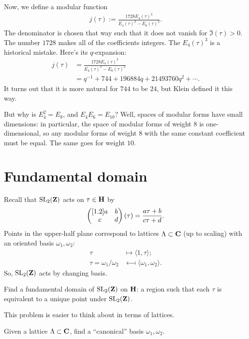 \documentclass[11pt, oneside,margin=1in]{article}
\begin{document}
\begin{example}[ ]
Now, we define a modular function
 \begin{align*}
	j(\tau) :=  \frac{1728E_4(\tau)^3}{E_4(\tau)^3 -  E_6(\tau)^2}.
\end{align*}
The denominator is chosen that way such that it does not vanish for $\Im(\tau)>0$. The number $1728$ makes all of the coefficients integers. The $E_4(\tau)^3$ is a historical mistake. Here's its  $q$-expansion:
\begin{align*}
	j(\tau) &=  \frac{1728E_4(\tau)^3}{E_4(\tau)^3 -  E_6(\tau)^2}\\
		&= q^{-1} + 744 + 196884 q +21493760q^2+\cdots. 
\end{align*}
It turns out that it is more natural for $744$ to be $24$, but Klein defined it this way.

But why is $E_4^2 = E_8$, and $E_4E_6=E_{10}$? Well, spaces of modular forms have small dimensions: in particular, the space of modular forms of weight $8$ is one-dimensional, so any modular forms of weight $8$ with the same constant coefficient must be equal. The same goes for weight $10$.
\end{example}

\section{Fundamental domain}
Recall that $\operatorname{SL}_{2}(\mathbf Z)$ acts on $\tau \in \mathbf H$ by
\begin{align*}
	\begin{pmatrix} [ 1.2 ] a&b\\c&d\end{pmatrix}(\tau) =  \frac{a\tau+b}{c\tau + d}.
\end{align*}
Points in the upper-half plane correspond to lattices $\Lambda\subset \mathbf C$ (up to scaling) with an oriented basis $\omega_1,\omega_2$: \begin{align*}
	\tau &\longmapsto \langle 1,\tau\rangle;\\
	\tau = \omega_1/\omega_2 &\longmapsfrom \langle \omega_1,\omega_2\rangle.
\end{align*}
So, $\operatorname{SL}_{2}(\mathbf Z)$ acts by changing basis.

\begin{problem}
	Find a fundamental domain of $\operatorname{SL}_{2}(\mathbf Z)$ on $\mathbf H$: a region such that each $\tau$ is equivalent to a unique point under $\operatorname{SL}_{2}(\mathbf Z)$.
\end{problem}

This problem is easier to think about in terms of lattices.

\begin{problem}
	Given a lattice $\Lambda \subset \mathbf C$, find a ``canonical'' basis $\omega_1,\omega_2$.
\end{problem}
\end{document}
